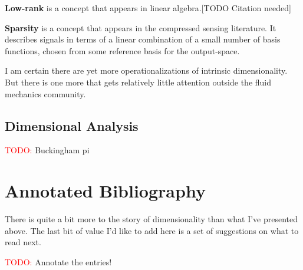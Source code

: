 \documentclass{article}
\begin{document}
\bigskip\noindent \textbf{Low-rank} is a concept that appears in linear
algebra.[TODO Citation needed]

\bigskip\noindent \textbf{Sparsity} is a concept that appears in the compressed
sensing literature.\cite{candes2008introduction} It describes signals in terms
of a linear combination of a small number of basis functions, chosen from some
reference basis for the output-space.

\bigskip
I am certain there are yet more operationalizations of intrinsic dimensionality.
But there is one more that gets relatively little attention outside the fluid
mechanics community.

\subsection{Dimensional Analysis}
\textcolor{red}{TODO:} Buckingham pi

\section{Annotated Bibliography}
There is quite a bit more to the story of dimensionality than what I've
presented above. The last bit of value I'd like to add here is a set of
suggestions on what to read next.

\textcolor{red}{TODO:} Annotate the entries!



\end{document}
